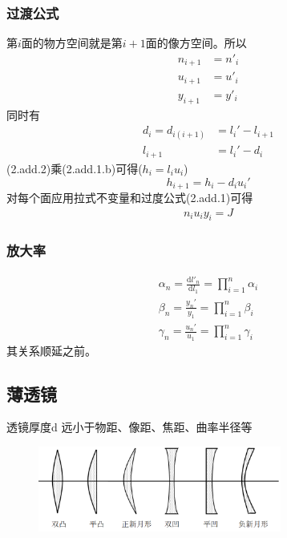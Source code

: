     \subsubsection{过渡公式}
第$i$面的物方空间就是第$i+1$面的像方空间。所以
\begin{align}
    n_{i+1}&=n'_{i} \tag{2.add.1.a}\\
     u_{i+1}&=u'_{i} \tag{2.add.1.b}\\
     y_{i+1}&=y'_{i} \tag{2.add.1.c} 
\end{align}
同时有
\begin{align}
d_i=d_{i(i+1)}&=l_{i}'-l_{i+1} \tag{2.add.2.pre} \\
l_{i+1}&=l_{i}'-d_i \tag{2.add.2}
\end{align}
(2.add.2)乘(2.add.1.b)可得($h_i=l_iu_i$)
\begin{equation}
h_{i+1}=h_i-d_i u_{i}'\tag{2.add.3}
\end{equation}
对每个面应用拉式不变量和过度公式(2.add.1)可得
\begin{align}
    n_iu_iy_i=J \tag{2.add.4}
\end{align}
       
\subsubsection{放大率}
\begin{align}
    \alpha_n=\frac{\mathrm{d}{l'_n}}{\mathrm{d}{l_1}}=\prod_{i=1}^n \alpha_i \tag{2.1.1.a}\\
    \beta_n=\frac{y_n'}{y_1}=\prod_{i=1}^n \beta_i \tag{2.1.1.b}\\
    \gamma_n=\frac{u_n'}{u_1}=\prod_{i=1}^n \gamma_i \tag{2.1.1.c}
\end{align}
其关系顺延之前。
\subsection{薄透镜}
\begin{description}[leftmargin=0.7cm,style=nextline,nosep]%
    \item[薄透镜] 透镜厚度d 远小于物距、像距、焦距、曲率半径等 
       \begin{figure}[H]
                \centering
                \includegraphics[width=8cm]{img/1.5.png}
                \end{figure}
\end{description}
